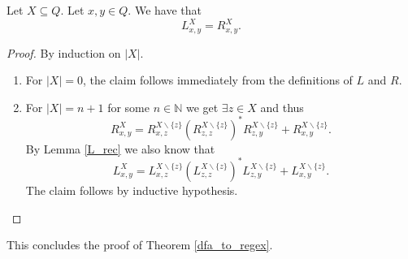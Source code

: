 \begin{lemma}
    \label{L_R}
    Let $X \subseteq Q$. Let $x,y \in Q$. We have that 
    \begin{equation*}
        L^X_{x,y} = R^X_{x,y}.
    \end{equation*}
\end{lemma}
\begin{proof}
    By induction on $|X|$.
    \begin{enumerate}
        \item For $|X| = 0$, the claim follows immediately from the definitions of $L$ and $R$. 
        \item For $|X| = n+1$ for some $n \in \mathbb{N}$ we get $\exists z \in X$ and thus 
            \begin{equation*}
                R^X_{x,y} = R^{X\backslash\{z\}}_{x,z} (R^{X\backslash\{z\}}_{z,z})^* R^{X\backslash\{z\}}_{z,y} 
                + R^{X\backslash\{z\}}_{x,y}.
            \end{equation*}
            By Lemma \ref{L_rec} we also know that 
            \begin{equation*}
                L^X_{x,y} = L^{X\backslash\{z\}}_{x,z} (L^{X\backslash\{z\}}_{z,z})^* L^{X\backslash\{z\}}_{z,y}
                + L^{X\backslash\{z\}}_{x,y}.
            \end{equation*}
            The claim follows by inductive hypothesis.
    \end{enumerate}
\end{proof}


This concludes the proof of Theorem \ref{dfa_to_regex}.

